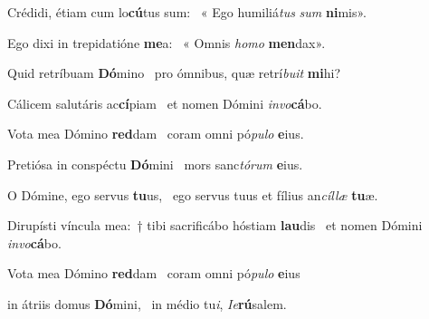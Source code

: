\item Crédidi, étiam cum lo\textbf{cú}tus sum:~\psstar{} « Ego humiliá\textit{tus} \textit{sum} \textbf{ni}mis».

\item Ego dixi in trepidatióne \textbf{me}a:~\psstar{} « Omnis \textit{homo} \textbf{men}dax».

\item Quid retríbuam \textbf{Dó}mino~\psstar{} pro ómnibus, quæ retrí\textit{buit} \textbf{mi}hi?

\item Cálicem salutáris ac\textbf{cí}piam~\psstar{} et nomen Dómini \textit{invo}\textbf{cá}bo.

\item Vota mea Dómino \textbf{red}dam~\psstar{} coram omni pó\textit{pulo} \textbf{e}ius.

\item Pretiósa in conspéctu \textbf{Dó}mini~\psstar{} mors sanc\textit{tórum} \textbf{e}ius.

\item O Dómine, ego servus \textbf{tu}us,~\psstar{} ego servus tuus et fílius an\textit{cíllæ} \textbf{tu}æ.

\item Dirupísti víncula mea:~† tibi sacrificábo hóstiam \textbf{lau}dis~\psstar{} et nomen Dómini \textit{invo}\textbf{cá}bo.

\item Vota mea Dómino \textbf{red}dam~\psstar{} coram omni pó\textit{pulo} \textbf{e}ius

\item in átriis domus \textbf{Dó}mini,~\psstar{} in médio tu\textit{i}, \textit{Ie}\textbf{rú}salem.
